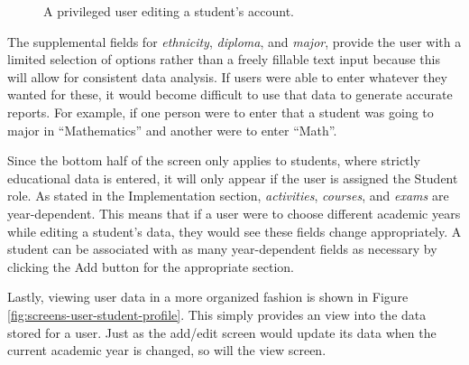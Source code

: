 \begin{figure}[h!]
	\centering
	\caption{A privileged user editing a student's account.}
	\label{fig:screens-user-student-edit}
\end{figure}

The supplemental fields for \emph{ethnicity}, \emph{diploma}, and \emph{major}, provide the user with a limited selection of options rather than a freely fillable text input because this will allow for consistent data analysis. If users were able to enter whatever they wanted for these, it would become difficult to use that data to generate accurate reports. For example, if one person were to enter that a student was going to major in ``Mathematics'' and another were to enter ``Math''.

Since the bottom half of the screen only applies to students, where strictly educational data is entered, it will only appear if the user is assigned the Student role. As stated in the Implementation section, \emph{activities}, \emph{courses}, and \emph{exams} are year-dependent. This means that if a user were to choose different academic years while editing a student's data, they would see these fields change appropriately. A student can be associated with as many year-dependent  fields as necessary by clicking the Add button for the appropriate section.

Lastly, viewing user data in a more organized fashion is shown in Figure \ref{fig:screens-user-student-profile}. This simply provides an view into the data stored for a user. Just as the add/edit screen would update its data when the current academic year is changed, so will the view screen.


